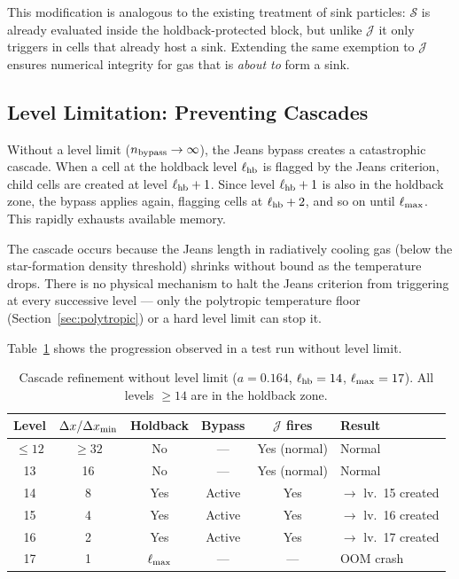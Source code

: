 \documentclass[fleqn,usenatbib]{mnras}
\newcommand{\dx}{\Delta x}
\begin{document}
This modification is analogous to the existing treatment of sink
particles: $\mathcal{S}$ is already evaluated inside the
holdback-protected block, but unlike $\mathcal{J}$ it only triggers in
cells that already host a sink.  Extending the same exemption to
$\mathcal{J}$ ensures numerical integrity for gas that is
\emph{about to} form a sink.


\subsection{Level Limitation: Preventing Cascades}
\label{sec:cascade}

Without a level limit ($n_{\rm bypass}\to\infty$), the Jeans bypass
creates a catastrophic cascade.  When a cell at the holdback level
$\ell_{\rm hb}$ is flagged by the Jeans criterion, child cells are
created at level $\ell_{\rm hb}+1$.  Since level $\ell_{\rm hb}+1$ is
also in the holdback zone, the bypass applies again, flagging cells at
$\ell_{\rm hb}+2$, and so on until $\ell_{\rm max}$.  This rapidly
exhausts available memory.

The cascade occurs because the Jeans length in radiatively cooling gas
(below the star-formation density threshold) shrinks without bound as
the temperature drops.  There is no physical mechanism to halt the
Jeans criterion from triggering at every successive level --- only the
polytropic temperature floor (Section~\ref{sec:polytropic}) or a hard
level limit can stop it.

Table~\ref{tab:cascade} shows the progression observed in a test run
without level limit.

\begin{table}
\centering
\caption{Cascade refinement without level limit ($a=0.164$,
$\ell_{\rm hb}=14$, $\ell_{\rm max}=17$).  All levels $\ge 14$ are
in the holdback zone.}
\label{tab:cascade}
\begin{tabular}{cccccl}
\toprule
Level & $\dx/\dx_{\rm min}$ & Holdback & Bypass &
$\mathcal{J}$ fires & Result \\
\midrule
$\le 12$ & $\ge 32$  & No  & ---    & Yes (normal) & Normal \\
13       & 16        & No  & ---    & Yes (normal) & Normal \\
14       & 8         & Yes & Active & Yes          & $\to$ lv.~15 created \\
15       & 4         & Yes & Active & Yes          & $\to$ lv.~16 created \\
16       & 2         & Yes & Active & Yes          & $\to$ lv.~17 created \\
17       & 1         & $\ell_{\rm max}$ & ---  & ---  & OOM crash \\
\bottomrule
\end{tabular}
\end{table}
\end{document}
